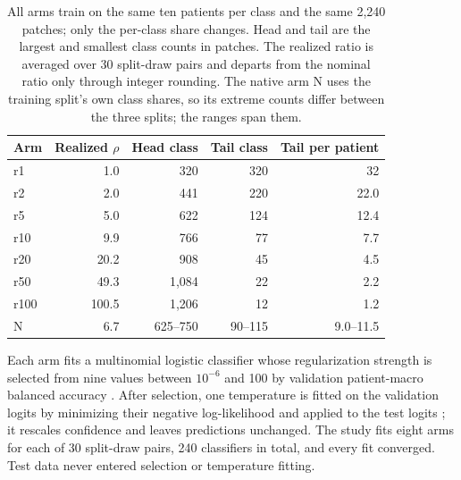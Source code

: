 \documentclass[11pt]{article}
\begin{document}
\begin{table}[htbp]
\centering
\renewcommand{\arraystretch}{1.15}
\begin{tabular}{@{}lrrrr@{}}
\toprule
Arm & Realized $\rho$ & Head class & Tail class & Tail per patient \\
\midrule
r1 & 1.0 & 320 & 320 & 32 \\
r2 & 2.0 & 441 & 220 & 22.0 \\
r5 & 5.0 & 622 & 124 & 12.4 \\
r10 & 9.9 & 766 & 77 & 7.7 \\
r20 & 20.2 & 908 & 45 & 4.5 \\
r50 & 49.3 & 1,084 & 22 & 2.2 \\
r100 & 100.5 & 1,206 & 12 & 1.2 \\
N & 6.7 & 625--750 & 90--115 & 9.0--11.5 \\
\bottomrule
\end{tabular}
\caption{All arms train on the same ten patients per class and the same 2,240 patches; only the per-class share changes. Head and tail are the largest and smallest class counts in patches. The realized ratio is averaged over 30 split-draw pairs and departs from the nominal ratio only through integer rounding. The native arm N uses the training split's own class shares, so its extreme counts differ between the three splits; the ranges span them.}
\label{tab:arms}
\end{table}

\noindent Each arm fits a multinomial logistic classifier whose regularization strength is selected from nine values between $10^{-6}$ and 100 by validation patient-macro balanced accuracy \citep{queisler2026patientShortage}. After selection, one temperature is fitted on the validation logits by minimizing their negative log-likelihood and applied to the test logits \citep{guo2017calibration}; it rescales confidence and leaves predictions unchanged. The study fits eight arms for each of 30 split-draw pairs, 240 classifiers in total, and every fit converged. Test data never entered selection or temperature fitting.
\end{document}
